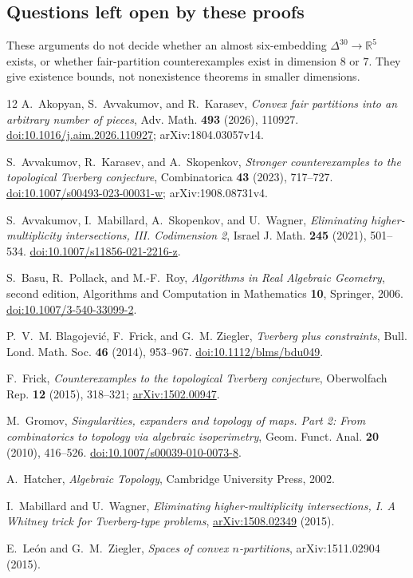 \documentclass[a4paper,11pt,reqno]{amsart}
\newcommand{\R}{\mathbb R}
\theoremstyle{definition}
\theoremstyle{remark}
\numberwithin{equation}{section}
\begin{document}
\subsection*{Questions left open by these proofs}
These arguments do not decide whether an almost six-embedding
$\Delta^{30}\to\R^5$ exists, or whether fair-partition counterexamples
exist in dimension $8$ or $7$. They give existence bounds, not
nonexistence theorems in smaller dimensions.

\begin{thebibliography}{12}
A.~Akopyan, S.~Avvakumov, and R.~Karasev,
\emph{Convex fair partitions into an arbitrary number of pieces},
Adv. Math. \textbf{493} (2026), 110927.
\href{https://doi.org/10.1016/j.aim.2026.110927}{doi:10.1016/j.aim.2026.110927};
arXiv:1804.03057v14.

S.~Avvakumov, R.~Karasev, and A.~Skopenkov,
\emph{Stronger counterexamples to the topological Tverberg conjecture},
Combinatorica \textbf{43} (2023), 717--727.
\href{https://doi.org/10.1007/s00493-023-00031-w}{doi:10.1007/s00493-023-00031-w};
arXiv:1908.08731v4.

S.~Avvakumov, I.~Mabillard, A.~Skopenkov, and U.~Wagner,
\emph{Eliminating higher-multiplicity intersections, III. Codimension 2},
Israel J. Math. \textbf{245} (2021), 501--534.
\href{https://doi.org/10.1007/s11856-021-2216-z}{doi:10.1007/s11856-021-2216-z}.

S.~Basu, R.~Pollack, and M.-F.~Roy,
\emph{Algorithms in Real Algebraic Geometry}, second edition,
Algorithms and Computation in Mathematics \textbf{10}, Springer, 2006.
\href{https://doi.org/10.1007/3-540-33099-2}{doi:10.1007/3-540-33099-2}.

P.~V.~M. Blagojevi\'c, F.~Frick, and G.~M. Ziegler,
\emph{Tverberg plus constraints},
Bull. Lond. Math. Soc. \textbf{46} (2014), 953--967.
\href{https://doi.org/10.1112/blms/bdu049}{doi:10.1112/blms/bdu049}.

F.~Frick,
\emph{Counterexamples to the topological Tverberg conjecture},
Oberwolfach Rep. \textbf{12} (2015), 318--321;
\href{https://arxiv.org/abs/1502.00947}{arXiv:1502.00947}.

M.~Gromov,
\emph{Singularities, expanders and topology of maps. Part 2:
From combinatorics to topology via algebraic isoperimetry},
Geom. Funct. Anal. \textbf{20} (2010), 416--526.
\href{https://doi.org/10.1007/s00039-010-0073-8}{doi:10.1007/s00039-010-0073-8}.

A.~Hatcher, \emph{Algebraic Topology}, Cambridge University Press, 2002.

I.~Mabillard and U.~Wagner,
\emph{Eliminating higher-multiplicity intersections, I.
A Whitney trick for Tverberg-type problems},
\href{https://arxiv.org/abs/1508.02349}{arXiv:1508.02349} (2015).

E.~Le\'on and G.~M.~Ziegler,
\emph{Spaces of convex $n$-partitions}, arXiv:1511.02904 (2015).
\end{thebibliography}
\end{document}
